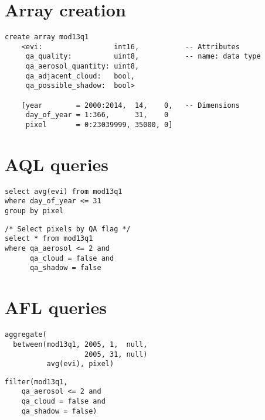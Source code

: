 \documentclass{article}
\begin{document}
\section*{Array creation}

\begin{lstlisting}
create array mod13q1
    <evi:                 int16,           -- Attributes
     qa_quality:          uint8,           -- name: data type
     qa_aerosol_quantity: uint8,
     qa_adjacent_cloud:   bool,
     qa_possible_shadow:  bool>

    [year        = 2000:2014,  14,    0,   -- Dimensions
     day_of_year = 1:366,      31,    0
     pixel       = 0:23039999, 35000, 0]
\end{lstlisting}

\section*{AQL queries}

\begin{lstlisting}
select avg(evi) from mod13q1
where day_of_year <= 31
group by pixel
\end{lstlisting}

\begin{lstlisting}
/* Select pixels by QA flag */
select * from mod13q1
where qa_aerosol <= 2 and
      qa_cloud = false and
      qa_shadow = false
\end{lstlisting}

\section*{AFL queries}

\begin{lstlisting}
aggregate(
  between(mod13q1, 2005, 1,  null,
                   2005, 31, null)
          avg(evi), pixel)
\end{lstlisting}

\begin{lstlisting}
filter(mod13q1,  
    qa_aerosol <= 2 and
    qa_cloud = false and
    qa_shadow = false)
\end{lstlisting}
\end{document}
